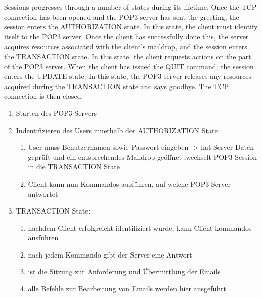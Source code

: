 \documentclass[11pt]{article}
\begin{document}
    Sessions progresses through a number of states during its
    lifetime.  Once the TCP connection has been opened and the POP3
    server has sent the greeting, the session enters the AUTHORIZATION
    state.  In this state, the client must identify itself to the POP3
    server.  Once the client has successfully done this, the server
    acquires resources associated with the client's maildrop, and the
    session enters the TRANSACTION state.  In this state, the client
    requests actions on the part of the POP3 server.  When the client has
    issued the QUIT command, the session enters the UPDATE state.  In
    this state, the POP3 server releases any resources acquired during
    the TRANSACTION state and says goodbye.  The TCP connection is then
    closed.


    \begin{enumerate}

        \item Starten des POP3 Servers
        \item Indentifizieren des Users innerhalb der AUTHORIZATION State:
        \begin{enumerate}
            \item User muss Benutzernamen sowie Passwort eingeben -> hat Server
            Daten geprüft und ein entsprechendes Maildrop geöffnet ,wechselt POP3
            Session in die TRANSACTION State
            \item Client kann nun Kommandos ausführen, auf welche POP3 Server antwortet

        \end{enumerate}

        \item TRANSACTION State:
        \begin{enumerate}
            \item nachdem Client erfolgreicht identifiziert wurde, kann Client kommandos ausführen
            \item nach jedem Kommando gibt der Server eine Antwort
            \item ist die Sitzung zur Anforderung und Übermittlung der Emails
            \item alle Befehle zur Bearbeitung von Emails werden hier ausgeführt
        \end{enumerate}


\end{enumerate}
\end{document}
